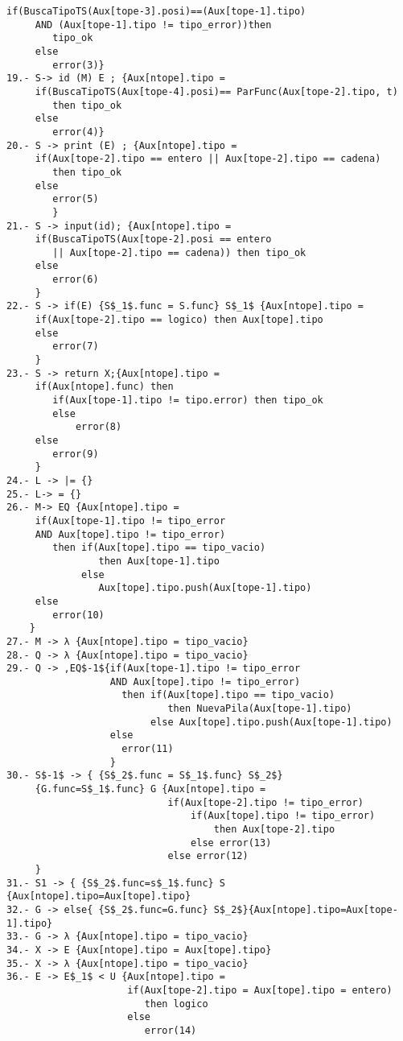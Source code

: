 \documentclass[a4paper, 12pt]{article}
\begin{document}
\begin{lstlisting}[style=EstadosAutomataST]
     if(BuscaTipoTS(Aux[tope-3].posi)==(Aux[tope-1].tipo)
     AND (Aux[tope-1].tipo != tipo_error))then
        tipo_ok
     else
        error(3)}
19.- S-> id (M) E ; {Aux[ntope].tipo =
     if(BuscaTipoTS(Aux[tope-4].posi)== ParFunc(Aux[tope-2].tipo, t)
        then tipo_ok
     else
        error(4)}
20.- S -> print (E) ; {Aux[ntope].tipo =
     if(Aux[tope-2].tipo == entero || Aux[tope-2].tipo == cadena)
        then tipo_ok
     else
        error(5)
        }
21.- S -> input(id); {Aux[ntope].tipo =
     if(BuscaTipoTS(Aux[tope-2].posi == entero
        || Aux[tope-2].tipo == cadena)) then tipo_ok
     else
        error(6)
     }
22.- S -> if(E) {S$_1$.func = S.func} S$_1$ {Aux[ntope].tipo =
     if(Aux[tope-2].tipo == logico) then Aux[tope].tipo
     else
        error(7)
     }
23.- S -> return X;{Aux[ntope].tipo =
     if(Aux[ntope].func) then
        if(Aux[tope-1].tipo != tipo.error) then tipo_ok
        else
            error(8)
     else
        error(9)
     }
24.- L -> |= {}
25.- L-> = {}
26.- M-> EQ {Aux[ntope].tipo =
     if(Aux[tope-1].tipo != tipo_error
     AND Aux[tope].tipo != tipo_error)
        then if(Aux[tope].tipo == tipo_vacio)
                then Aux[tope-1].tipo
             else
                Aux[tope].tipo.push(Aux[tope-1].tipo)
     else
        error(10)
    }
27.- M -> λ {Aux[ntope].tipo = tipo_vacio}
28.- Q -> λ {Aux[ntope].tipo = tipo_vacio}
29.- Q -> ,EQ$-1${if(Aux[tope-1].tipo != tipo_error
                  AND Aux[tope].tipo != tipo_error)
                    then if(Aux[tope].tipo == tipo_vacio)
                            then NuevaPila(Aux[tope-1].tipo)
                         else Aux[tope].tipo.push(Aux[tope-1].tipo)
                  else
                    error(11)
                  }
30.- S$-1$ -> { {S$_2$.func = S$_1$.func} S$_2$}
     {G.func=S$_1$.func} G {Aux[ntope].tipo =
                            if(Aux[tope-2].tipo != tipo_error)
                                if(Aux[tope].tipo != tipo_error)
                                    then Aux[tope-2].tipo
                                else error(13)
                            else error(12)
     }
31.- S1 -> { {S$_2$.func=s$_1$.func} S {Aux[ntope].tipo=Aux[tope].tipo}
32.- G -> else{ {S$_2$.func=G.func} S$_2$}{Aux[ntope].tipo=Aux[tope-1].tipo}
33.- G -> λ {Aux[ntope].tipo = tipo_vacio}
34.- X -> E {Aux[ntope].tipo = Aux[tope].tipo}
35.- X -> λ {Aux[ntope].tipo = tipo_vacio}
36.- E -> E$_1$ < U {Aux[ntope].tipo =
                     if(Aux[tope-2].tipo = Aux[tope].tipo = entero)
                        then logico
                     else
                        error(14)

\end{lstlisting}
\end{document}

